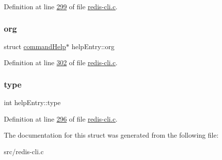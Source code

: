 Definition at line \hyperlink{redis-cli_8c_source_l00299}{299} of file \hyperlink{redis-cli_8c_source}{redis-\/cli.\+c}.

\mbox{\label{structhelpEntry_a61f1bf14285f0030c4465cbda8338803}} 
\subsubsection{\texorpdfstring{org}{org}}
{\footnotesize\ttfamily struct \hyperlink{structcommandHelp}{command\+Help}$\ast$ help\+Entry\+::org}



Definition at line \hyperlink{redis-cli_8c_source_l00302}{302} of file \hyperlink{redis-cli_8c_source}{redis-\/cli.\+c}.

\mbox{\label{structhelpEntry_a5ec4aaa14b4effb4d4141580541173ff}} 
\subsubsection{\texorpdfstring{type}{type}}
{\footnotesize\ttfamily int help\+Entry\+::type}



Definition at line \hyperlink{redis-cli_8c_source_l00296}{296} of file \hyperlink{redis-cli_8c_source}{redis-\/cli.\+c}.



The documentation for this struct was generated from the following file\+:\begin{DoxyCompactItemize}
\item 
src/redis-\/cli.\+c\end{DoxyCompactItemize}
